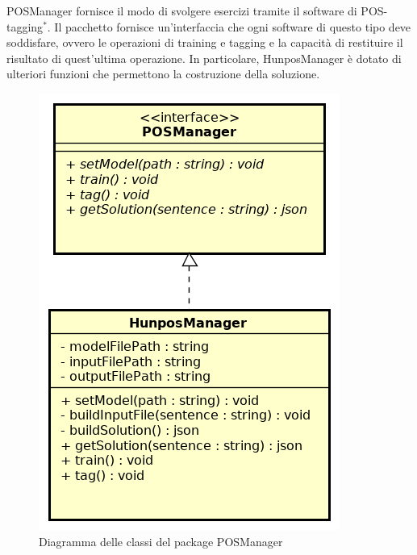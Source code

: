POSManager fornisce il modo di svolgere esercizi tramite il software di POS-tagging$^{*}$. Il pacchetto fornisce un'interfaccia che ogni software di questo tipo deve soddisfare, ovvero le operazioni di training e tagging e la capacità di restituire il risultato di quest'ultima operazione. In particolare, HunposManager è dotato di ulteriori funzioni che permettono la costruzione della soluzione. 

\begin{figure}[ht]
	\centering
	\includegraphics[scale=0.5]{images/POSManager.png}
	\caption{Diagramma delle classi del package POSManager}
\end{figure}